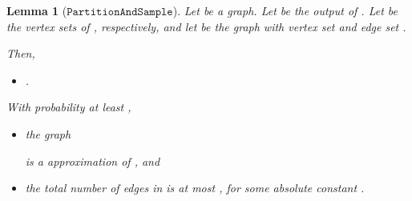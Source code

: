 \documentclass[11pt]{article}
\newtheorem{lemma}[theorem]{Lemma}
\newcommand{\partsample}{\ensuremath{\mathtt{PartitionAndSample}}}
\begin{document}
\begin{lemma}[\partsample]\label{lem:partsample}
Let  be a graph.
Let  be the output
  of .
Let  be the vertex sets of
  , respectively, and let
   be the graph with vertex set  and edge set
  .


Then,
\begin{itemize}
\item [(PS.1)]
.
\end{itemize}
With probability at least ,
\begin{itemize}
\item [(PS.2)]
  the graph

is a  approximation of , and
\item [(PS.3)]
the total number of edges in 
  is at most , for some 
  absolute constant .
\end{itemize}

\end{lemma}
\end{document}
